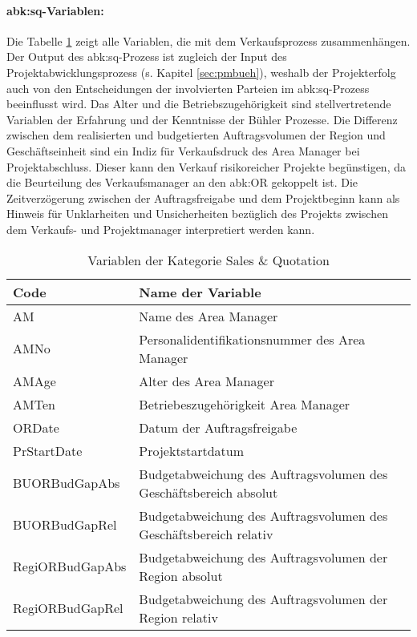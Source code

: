\paragraph{\gls{abk:sq}-Variablen:} Die Tabelle \ref{tab:sqvar} zeigt alle Variablen, die mit dem Verkaufsprozess zusammenhängen. Der Output des \gls{abk:sq}-Prozess ist zugleich der Input des Projektabwicklungsprozess (s. Kapitel \ref{sec:pmbueh}), weshalb der Projekterfolg auch von den Entscheidungen der involvierten Parteien im \gls{abk:sq}-Prozess beeinflusst wird. Das Alter und die Betriebszugehörigkeit sind stellvertretende Variablen der Erfahrung und der Kenntnisse der Bühler Prozesse. Die Differenz zwischen dem realisierten und budgetierten Auftragsvolumen der Region und Geschäftseinheit sind ein Indiz für  Verkaufsdruck des Area Manager bei Projektabschluss. Dieser kann den Verkauf risikoreicher Projekte begünstigen, da die Beurteilung des Verkaufsmanager an den \gls{abk:OR} gekoppelt ist. Die Zeitverzögerung zwischen der Auftragsfreigabe und dem Projektbeginn kann als Hinweis für Unklarheiten und Unsicherheiten bezüglich des Projekts zwischen dem Verkaufs- und Projektmanager interpretiert werden kann.
\begin{table}[htbp]
	\centering
	\caption{Variablen der Kategorie Sales \& Quotation}
	\begin{tabular}{ll}
		\toprule
		\textbf{Code} & \textbf{Name der Variable} \\
		\midrule
		AM    & Name des Area Manager \\
		AMNo  & Personalidentifikationsnummer des Area Manager  \\
		AMAge & Alter des Area Manager  \\
		AMTen & Betriebeszugehörigkeit Area Manager  \\
		ORDate & Datum der Auftragsfreigabe \\
		PrStartDate & Projektstartdatum \\
		BUORBudGapAbs & Budgetabweichung des Auftragsvolumen des Geschäftsbereich absolut \\
		BUORBudGapRel & Budgetabweichung des Auftragsvolumen des Geschäftsbereich relativ \\
		RegiORBudGapAbs & Budgetabweichung des Auftragsvolumen der Region absolut \\
		RegiORBudGapRel & Budgetabweichung des Auftragsvolumen der Region relativ \\
		\bottomrule
	\end{tabular}%
	\label{tab:sqvar}%
\end{table}%

